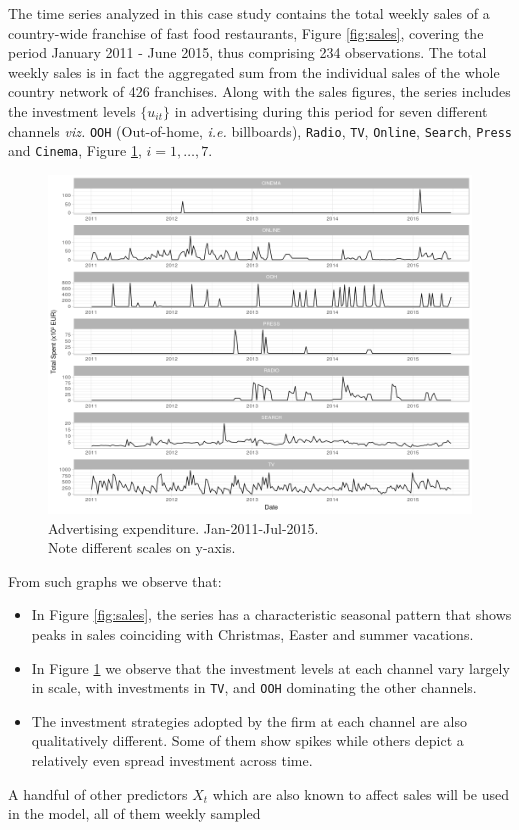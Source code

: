 The time series analyzed in this case study contains the total weekly sales of a country-wide franchise of fast food restaurants, Figure \ref{fig:sales}, covering the period January 2011 - June 2015, thus comprising 234 observations. The total weekly sales is in fact the aggregated sum from the individual sales of the whole country network of 426 franchises. Along with the sales figures, the series includes the investment levels $\{u_{it}\}$  in advertising during this period  for seven different channels \emph{viz.} \texttt{OOH} (Out-of-home, \emph{i.e.} billboards), \texttt{Radio}, \texttt{TV}, \texttt{Online}, \texttt{Search}, \texttt{Press} and \texttt{Cinema}, Figure \ref{fig:canales}, $i=1,\ldots,7$.



\begin{figure}[h]
\centering
\includegraphics[scale=0.5]{figures/02_canales_b.png}
\caption{Advertising expenditure. Jan-2011-Jul-2015. \\ Note  different scales on  y-axis.}\label{fig:canales}
\end{figure}

From such graphs we observe that:
\begin{itemize}
\item In Figure \ref{fig:sales}, the series has a characteristic seasonal pattern that shows peaks in sales coinciding with Christmas, Easter and summer vacations. 
\item In Figure \ref{fig:canales} we observe that the investment levels at each channel vary largely in scale, with investments in \texttt{TV}, and \texttt{OOH} dominating the other channels.
\item The investment strategies adopted by the firm at each channel are also qualitatively different. Some of them show spikes while others depict a relatively even spread investment across time.%
\end{itemize}
A handful of other predictors $X_t$ which are also known to affect sales will be used in the model, all of them weekly sampled

